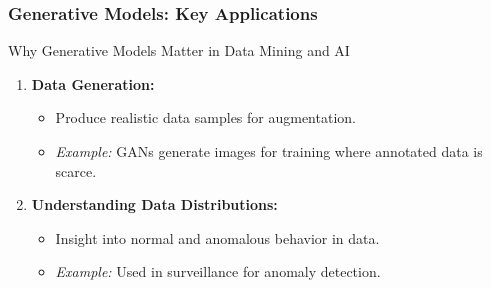 \documentclass[aspectratio=169]{beamer}
\begin{document}
\begin{frame}[fragile]
    \frametitle{Generative Models: Key Applications}
    \begin{block}{Why Generative Models Matter in Data Mining and AI}
        \begin{enumerate}
            \item \textbf{Data Generation:}
                \begin{itemize}
                    \item Produce realistic data samples for augmentation.
                    \item \textit{Example:} GANs generate images for training where annotated data is scarce.
                \end{itemize}
            \item \textbf{Understanding Data Distributions:}
                \begin{itemize}
                    \item Insight into normal and anomalous behavior in data.
                    \item \textit{Example:} Used in surveillance for anomaly detection.
                \end{itemize}
        \end{enumerate}
    \end{block}
\end{frame}
\end{document}
